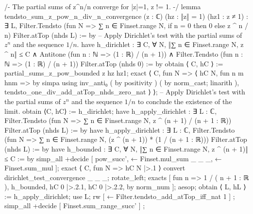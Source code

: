 /-
The partial sums of z^n/n converge for |z|=1, z != 1.
-/
lemma tendsto_sum_z_pow_n_div_n_convergence (z : ℂ) (hz : ‖z‖ = 1) (hz1 : z ≠ 1) :
  ∃ L, Filter.Tendsto (fun N => ∑ n ∈ Finset.range N, if n = 0 then 0 else z ^ n / n) Filter.atTop (nhds L) := by
    -- Apply Dirichlet's test with the partial sums of $z^n$ and the sequence $1/n$.
    have h_dirichlet : ∃ C, ∀ N, ‖∑ n ∈ Finset.range N, z ^ n‖ ≤ C ∧ Antitone (fun n : ℕ => (1 : ℝ) / (n + 1)) ∧ Filter.Tendsto (fun n : ℕ => (1 : ℝ) / (n + 1)) Filter.atTop (nhds 0) := by
      obtain ⟨ C, hC ⟩ := partial_sums_z_pow_bounded z hz hz1;
      exact ⟨ C, fun N => ⟨ hC N, fun n m hnm => by simpa using inv_anti₀ ( by positivity ) ( by norm_cast; linarith ), tendsto_one_div_add_atTop_nhds_zero_nat ⟩ ⟩;
    -- Apply Dirichlet's test with the partial sums of $z^n$ and the sequence $1/n$ to conclude the existence of the limit.
    obtain ⟨C, hC⟩ := h_dirichlet;
    have h_apply_dirichlet : ∃ L : ℂ, Filter.Tendsto (fun N => ∑ n ∈ Finset.range N, z ^ (n + 1) / (n + 1 : ℝ)) Filter.atTop (nhds L) := by
      have h_apply_dirichlet : ∃ L : ℂ, Filter.Tendsto (fun N => ∑ n ∈ Finset.range N, (z ^ (n + 1)) * (1 / (n + 1 : ℝ))) Filter.atTop (nhds L) := by
        have h_bounded : ∃ C, ∀ N, ‖∑ n ∈ Finset.range N, z ^ (n + 1)‖ ≤ C := by
          simp_all +decide [ pow_succ', ← Finset.mul_sum _ _ _, ← Finset.sum_mul ];
          exact ⟨ C, fun N => hC N |>.1 ⟩
        convert dirichlet_test_convergence _ _ _;
        rotate_left;
        exacts [ fun n => 1 / ( n + 1 : ℝ ), h_bounded, hC 0 |>.2.1, hC 0 |>.2.2, by norm_num ];
      aesop;
    obtain ⟨ L, hL ⟩ := h_apply_dirichlet; use L; rw [ ← Filter.tendsto_add_atTop_iff_nat 1 ] ; simp_all +decide [ Finset.sum_range_succ' ] ;

